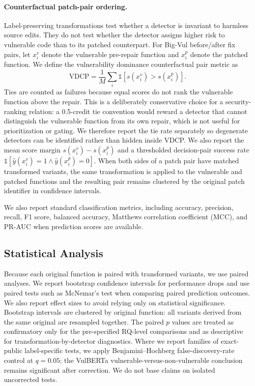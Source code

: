 \documentclass[a4paper,fleqn]{cas-dc}
\begin{document}
\paragraph{Counterfactual patch-pair ordering.}
Label-preserving transformations test whether a detector is invariant to
harmless source edits. They do not test whether the detector assigns higher
risk to vulnerable code than to its patched counterpart. For Big-Vul
before/after fix pairs, let $x_i^{v}$ denote the vulnerable pre-repair function
and $x_i^{p}$ denote the patched function. We define the vulnerability
dominance counterfactual pair metric as
\begin{equation}
\text{VDCP}=\frac{1}{M}\sum_i \mathbb{1}[s(x_i^{v})>s(x_i^{p})].
\end{equation}
Ties are counted as failures because equal scores do not rank the vulnerable
function above the repair. This is a deliberately conservative choice for a
security-ranking relation: a 0.5-credit tie convention would reward a detector
that cannot distinguish the vulnerable function from its own repair, which is
not useful for prioritization or gating. We therefore report the tie rate
separately so degenerate detectors can be identified rather than hidden inside
VDCP. We also report the mean score margin $s(x_i^{v})-s(x_i^{p})$ and a thresholded
decision-pair success rate
$\mathbb{1}[\hat{y}(x_i^{v})=1 \land \hat{y}(x_i^{p})=0]$. When both sides of a
patch pair have matched transformed variants, the same transformation is
applied to the vulnerable and patched functions and the resulting pair remains
clustered by the original patch identifier in confidence intervals.

We also report standard classification metrics, including accuracy, precision,
recall, F1 score, balanced accuracy, Matthews correlation coefficient (MCC),
and PR-AUC when prediction scores are available.

\subsection{Statistical Analysis}

Because each original function is paired with transformed variants, we use
paired analyses. We report bootstrap confidence intervals for performance
drops and use paired tests such as McNemar's test when comparing paired
prediction outcomes. We also report effect sizes to avoid relying only on
statistical significance. Bootstrap intervals are clustered by original
function: all variants derived from the same original are resampled together.
The paired $p$ values are treated as confirmatory only for the pre-specified
RQ-level comparisons and as descriptive for transformation-by-detector
diagnostics. Where we report families of exact-public label-specific tests, we
apply Benjamini--Hochberg false-discovery-rate control at $q=0.05$; the
VulBERTa vulnerable-versus-non-vulnerable conclusion remains significant after
correction. We do not base claims on isolated uncorrected tests.
\end{document}
